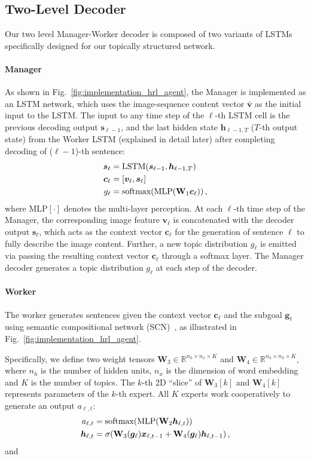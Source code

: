 \documentclass[letterpaper]{article} \usepackage{aaai19}  \usepackage{times}  \usepackage{helvet}  \usepackage{courier}  \usepackage{url}  \usepackage{graphicx}
\newcommand{\Wmat}{{\bf W}}
\newcommand{\cv}{{\boldsymbol c}}
\newcommand{\gv}{{\boldsymbol g}}
\newcommand{\hv}{{\boldsymbol h}}
\newcommand{\sv}{{\boldsymbol s}}
\newcommand{\vv}{{\boldsymbol v}}
\newcommand{\xv}{{\boldsymbol x}}
\newcommand{\R}{\mathbb{R}}
\begin{document}
\subsection{Two-Level Decoder}
Our two level Manager-Worker decoder is composed of two variants of LSTMs specifically designed for our topically structured network. 
\paragraph{Manager}
As shown in Fig.~\ref{fig:implementation_hrl_agent}, the Manager is implemented as an LSTM network, which uses the image-sequence content vector $\bar{\vv}$ as the initial input to the LSTM. 
The input to any time step of the $\ell$-th LSTM cell is the previous decoding output $\sv_{\ell-1}$, and the last hidden state $\hv_{\ell-1,T}$ ($T$-th output state) from the Worker LSTM (explained in detail later) after completing decoding of ($\ell-1$)-th sentence:
\begin{align}
	\sv_{\ell} &= \textrm{LSTM} (\sv_{\ell-1}, \hv_{\ell-1,T}) \\
	\cv_{\ell} &= [\vv_{\ell}, \sv_{\ell}] \\
	g_{\ell} &= \textrm{softmax} (\textrm{MLP}(\Wmat_1\cv_{\ell})) \,,
\end{align}
where $\textrm{MLP}[\cdot]$ denotes the multi-layer perception.
At each $\ell$-th time step of the Manager, the corresponding image feature $\vv_{\ell}$ is concatenated with the decoder output $\sv_{\ell}$, which acts as the context vector $\cv_{\ell}$ for the generation of sentence $\ell$ to fully describe the image content. Further, a new topic distribution $g_{\ell}$ is emitted via passing the resulting context vector $\cv_{\ell}$ through a softmax layer. 
The Manager decoder generates a topic distribution $g_{\ell}$ at each step of the decoder.
\paragraph{Worker}
The worker generates sentences given the context vector $\cv_{\ell}$ and the subgoal $\gv_{\ell}$ using semantic compositional network (SCN)~\cite{SCN_CVPR2017}, as illustrated in Fig.~\ref{fig:implementation_hrl_agent}. 

Specifically, we define two weight tensors $\mathbf{W}_3 \in \R^{n_h\times n_x \times K}$ and $\mathbf{W}_4 \in \R^{n_h\times n_h \times K}$, where $n_h$ is the number of hidden units, $n_x$ is the dimension of word embedding and $K$ is the number of topics. The $k$-th 2D ``slice'' of $\mathbf{W}_3[k]$ and $\mathbf{W}_4[k]$ represents parameters of the $k$-th expert. All $K$ experts work cooperatively to generate an output $a_{\ell,t}$:
\begin{align}
	a_{\ell,t} &= \textrm{softmax}(\textrm{MLP}(\Wmat_2\hv_{\ell,t}))  \label{eqn:scn_1} \\
	\hv_{\ell,t} &= \sigma(\Wmat_3(\gv_{\ell}) \xv_{\ell,t-1} + \Wmat_4(\gv_{\ell}) \hv_{\ell,t-1}) \,,  \label{eqn:scn_2}
\end{align} 
and
\end{document}

